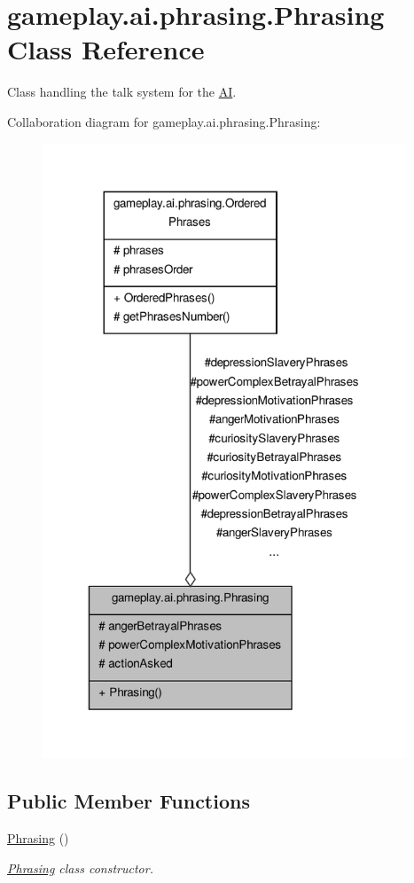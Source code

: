 \hypertarget{a00018}{\section{gameplay.\-ai.\-phrasing.\-Phrasing Class Reference}
\label{a00018}
}


Class handling the talk system for the \hyperlink{a00001}{A\-I}.  




Collaboration diagram for gameplay.\-ai.\-phrasing.\-Phrasing\-:
\nopagebreak
\begin{figure}[H]
\begin{center}
\leavevmode
\includegraphics[width=308pt]{a00120}
\end{center}
\end{figure}
\subsection*{Public Member Functions}
\begin{DoxyCompactItemize}
\item 
\hyperlink{a00018_a369fb65d1e9363006fb8f4fa31b438de}{Phrasing} ()
\begin{DoxyCompactList}\small\item\em \hyperlink{a00018}{Phrasing} class constructor. \end{DoxyCompactList}\end{DoxyCompactItemize}

